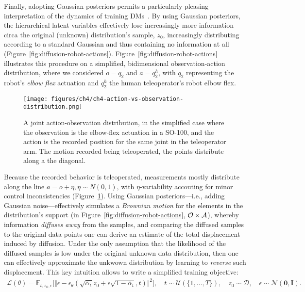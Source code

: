 Finally, adopting Gaussian posteriors permits a particularly pleasing interpretation of the dynamics of training DMs~\citep{permenterInterpretingImprovingDiffusion2024}.
By using Gaussian posteriors, the hierarchical latent variables effectively lose increasingly more information circa the original (unknown) distribution's sample, \( z_0 \), increasingly distributing according to a standard Gaussian and thus containing no information at all (Figure~\ref{fig:diffusion-robot-actions}).
Figure~\ref{fig:diffusion-robot-actions} illustrates this procedure on a simplified, bidimensional observation-action distribution, where we considered \( o=q_2\) and \( a=q^h_2\), with \( q_2 \) representing the robot's \emph{elbow flex} actuation and \( q^h_2 \) the human teleoperator's robot elbow flex.

\begin{figure}
    \centering
    \texttt{[image: figures/ch4/ch4-action-vs-observation-distribution.png]}
    \caption{A joint action-observation distribution, in the simplified case where the observation is the elbow-flex actuation in a SO-100, and the action is the recorded position for the same joint in the teleoperator arm. The motion recorded being teleoperated, the points distribute along a the diagonal.}
    \label{fig:ch4-action-vs-observation-distribution}
\end{figure}

Because the recorded behavior is teleoperated, measurements mostly distribute along the line \( a = o + \eta, \eta \sim N(0,1) \), with \( \eta \)-variability accouting for minor control inconsistencies (Figure~\ref{fig:ch4-action-vs-observation-distribution}).
Using Gaussian posteriors---i.e., adding Gaussian noise---effectively simulates a \emph{Brownian motion} for the elements in the distribution's support (in Figure~\ref{fig:diffusion-robot-actions}, \( \mathcal O \times \mathcal A \)), whereby information \emph{diffuses away} from the samples, and comparing the diffused samples to the original data points one can derive an estimate of the total displacement induced by diffusion.
Under the only assumption that the likelihood of the diffused samples is low under the original unknown data distribution, then one can effectively approximate the unkwown distribution by learning to \emph{reverse} such displacement.
This key intuition allows to write a simplified training objective:
\begin{align}\label{eq:diffusion-simplified-loss}
    \mathcal L(\theta) = \mathbb{E}_{t, z_0, \epsilon} \big[
        \Vert \epsilon - \epsilon_\theta(\sqrt{\bar \alpha_t} z_0 + \epsilon \sqrt{1 - \bar \alpha_t}, t) \Vert^2 \big], \quad t \sim \mathcal{U}(\{1,\dots,T\}), \quad
        z_0 \sim \mathcal{D}, \quad
        \epsilon \sim \mathcal{N}(\mathbf{0},\mathbf{I}).
\end{align}

